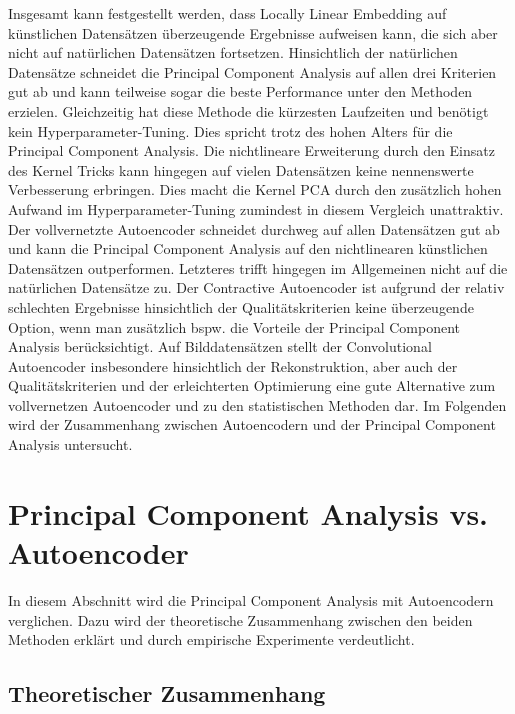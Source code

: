 Insgesamt kann festgestellt werden, dass Locally Linear Embedding auf künstlichen Datensätzen
überzeugende Ergebnisse aufweisen kann, die sich aber nicht auf natürlichen Datensätzen fortsetzen.
Hinsichtlich der natürlichen Datensätze schneidet die Principal Component Analysis auf allen drei
Kriterien gut ab und kann teilweise sogar die beste Performance unter den Methoden erzielen.
Gleichzeitig hat diese Methode die kürzesten Laufzeiten und benötigt kein Hyperparameter-Tuning.
Dies spricht trotz des hohen Alters für die Principal Component Analysis. Die nichtlineare
Erweiterung durch den Einsatz des Kernel Tricks kann hingegen auf vielen Datensätzen keine
nennenswerte Verbesserung erbringen. Dies macht die Kernel PCA durch den zusätzlich hohen Aufwand
im Hyperparameter-Tuning zumindest in diesem Vergleich unattraktiv. Der vollvernetzte Autoencoder
schneidet durchweg auf allen Datensätzen gut ab und kann die Principal Component Analysis auf den
nichtlinearen künstlichen Datensätzen outperformen. Letzteres trifft hingegen im Allgemeinen nicht
auf die natürlichen Datensätze zu. Der Contractive Autoencoder ist aufgrund der relativ schlechten
Ergebnisse hinsichtlich der Qualitätskriterien keine überzeugende Option, wenn man zusätzlich bspw.
die Vorteile der Principal Component Analysis berücksichtigt. Auf Bilddatensätzen stellt der
Convolutional Autoencoder insbesondere hinsichtlich der Rekonstruktion, aber auch der
Qualitätskriterien und der erleichterten Optimierung eine gute Alternative zum vollvernetzen
Autoencoder und zu den statistischen Methoden dar. Im Folgenden wird der Zusammenhang zwischen
Autoencodern und der Principal Component Analysis untersucht.

\section{Principal Component Analysis vs. Autoencoder}
\label{ch:Vergleich:sec:Resultate:PCA_AE}

In diesem Abschnitt wird die Principal Component Analysis mit Autoencodern verglichen. Dazu wird
der theoretische Zusammenhang zwischen den beiden Methoden erklärt und durch empirische Experimente
verdeutlicht.

\subsection{Theoretischer Zusammenhang}

